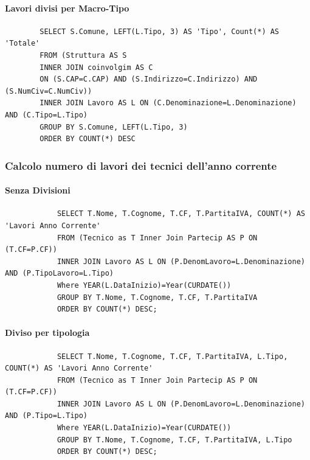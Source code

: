 \documentclass{elegantbook}
\begin{document}
\paragraph{Lavori divisi per Macro-Tipo}
	\begin{verbatim}
		SELECT S.Comune, LEFT(L.Tipo, 3) AS 'Tipo', Count(*) AS 'Totale'
		FROM (Struttura AS S 
		INNER JOIN coinvolgim AS C 
		ON (S.CAP=C.CAP) AND (S.Indirizzo=C.Indirizzo) AND (S.NumCiv=C.NumCiv))
		INNER JOIN Lavoro AS L ON (C.Denominazione=L.Denominazione) AND (C.Tipo=L.Tipo)
		GROUP BY S.Comune, LEFT(L.Tipo, 3)
		ORDER BY COUNT(*) DESC
	\end{verbatim}
\subsubsection{Calcolo numero di lavori dei tecnici dell'anno corrente}
	\paragraph{Senza Divisioni}
		\begin{verbatim}
			SELECT T.Nome, T.Cognome, T.CF, T.PartitaIVA, COUNT(*) AS 'Lavori Anno Corrente'
			FROM (Tecnico as T Inner Join Partecip AS P ON (T.CF=P.CF))
			INNER JOIN Lavoro AS L ON (P.DenomLavoro=L.Denominazione) AND (P.TipoLavoro=L.Tipo)
			Where YEAR(L.DataInizio)=Year(CURDATE())
			GROUP BY T.Nome, T.Cognome, T.CF, T.PartitaIVA
			ORDER BY COUNT(*) DESC;
		\end{verbatim}
	\begin{figure}[H]
		\centering
	\end{figure}
	\paragraph{Diviso per tipologia}
		\begin{verbatim}
			SELECT T.Nome, T.Cognome, T.CF, T.PartitaIVA, L.Tipo, COUNT(*) AS 'Lavori Anno Corrente'
			FROM (Tecnico as T Inner Join Partecip AS P ON (T.CF=P.CF))
			INNER JOIN Lavoro AS L ON (P.DenomLavoro=L.Denominazione) AND (P.Tipo=L.Tipo)
			Where YEAR(L.DataInizio)=Year(CURDATE())
			GROUP BY T.Nome, T.Cognome, T.CF, T.PartitaIVA, L.Tipo
			ORDER BY COUNT(*) DESC;
		\end{verbatim}
\end{document}
